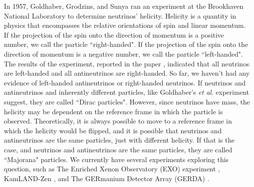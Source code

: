 In 1957, Goldhaber, Grodzins, and Sunya ran an experiment at the Brookhaven National Laboratory to determine neutrinos' helicity. Helicity is a quantity in physics that encompasses the relative orientations of spin and linear momentum. If the projection of the spin onto the direction of momentum is a positive number, we call the particle ``right-handed". If the projection of the spin onto the direction of momentum is a negative number, we call the particle ``left-handed".
The results of the experiment, reported in the paper \cite{helicity}, indicated that all neutrinos are left-handed and all antineutrinos are right-handed. So far, we haven't had any evidence of left-handed antineutrinos or right-handed neutrinos. 
If neutrinos and antineutrinos and inherently different particles, like Goldhaber's \textit{et al.} experiment suggest, they are called ``Dirac particles". 
However, since neutrinos have mass, the helicity may be dependent on the reference frame in which the particle is observed. Theoretically, it is always possible to move to a reference frame in which the helicity would be flipped, and it is possible that neutrinos and antineutrinos are the same particles, just with different helicity. If that is the case, and neutrinos and antineutrinos are the same particles, they are called ``Majorana" particles. 
We currently have several experiments exploring this question, such as The Enriched Xenon Observatory (EXO) experiment \cite{exo}, KamLAND-Zen \cite{KamLAND-Zen}, and The GERmanium Detector Array (GERDA) \cite{gerda}. 
